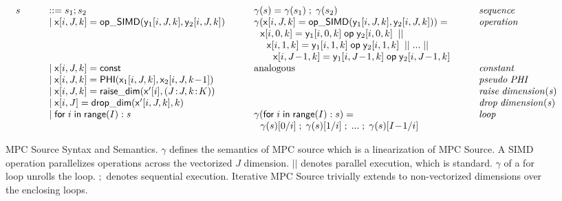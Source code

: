 \begin{figure*}%
\[
\begin{array}{l@{~~~~~}l}
  \begin{array}{l@{~~~~~~~~~}l@{~~~~~~~~~}l@{~~~~~~~~~}l}
  s &::= s_1;s_2 & \gamma(s) = \gamma(s_1) \; ; \; \gamma(s_2) & \mathit{sequence} \\
     & \mid \x[i,J,k] = {\sf op\_SIMD}(\y_1[i,J,k], \y_2[i,J,k]) & \gamma(\x[i,J,k] = {\sf op\_SIMD}(\y_1[i,J,k], \y_2[i,J,k])) = & \mathit{operation} \\ 
     &                                                                               & ~~\x[i,0,k] = \y_1[i,0,k] \; {\sf op} \; \y_2[i,0,k] \;\; || &  \\
     &                                                                               & ~~~~\x[i,1,k] = \y_1[i,1,k] \; {\sf op} \; \y_2[i,1,k] \;\; || \; ...\; || & \\
     &                                                                               & ~~~~~~\x[i,J\!-\!1,k] = \y_1[i,J\!-\!1,k] \; {\sf op} \; \y_2[i,J\!-\!1,k] & \\
     & \mid \x[i,J,k] = {\sf const} & \mbox{analogous} & \mathit{constant} \\
     & \mid \x[i,J,k]  = {\sf PHI}(\x_1[i,J,k],\x_2[i,J,k\!-\!1]) & & \mathit{pseudo} \; \mathit{PHI} \\
     & \mid \x[i,J,k] = {\sf raise\_dim}(\x'[i],(J\!:\!J,k\!:\!K)) & & \mathit{raise} \; \mathit{dimension(s)} \\
     & \mid \x[i,J] = {\sf drop\_dim}(\x'[i,J,k],k) &  & \mathit{drop} \; \mathit{dimension(s)} \\
     & \mid {\sf for} \; i \; {\sf in} \; {\sf range}(I): s  & \gamma({\sf for} \; i \; {\sf in} \; {\sf range}(I): s) = & \mathit{loop} \\
     & & ~~\gamma(s)[0/i] \; ; \; \gamma(s)[1/i] \; ; \; ... \; ; \; \gamma(s)[I\!-\!1/i] & \\
  \end{array}    \\
\end{array}
\]
\vspace{-3mm}
\caption{MPC Source Syntax and Semantics. $\gamma$ defines the semantics of MPC source which is a linearization of MPC Source. A SIMD operation parallelizes operations across the vectorized $J$ dimension. $||$ denotes parallel execution, which is standard. $\gamma$ of a for loop unrolls the loop. $;$ denotes sequential execution. Iterative MPC Source trivially extends to non-vectorized dimensions over the enclosing loops.}\label{fig:MPC_Source_syntax}
\label{fig:mpc_syntax}
\vspace{-5mm}
\end{figure*}

